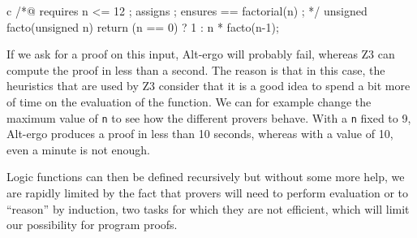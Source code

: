 \begin{CodeBlock}{c}
/*@ 
  requires n <= 12 ;
  assigns \nothing ;
  ensures \result == factorial(n) ; 
*/
unsigned facto(unsigned n){
  return (n == 0) ? 1 : n * facto(n-1);
}
\end{CodeBlock}



If we ask for a proof on this input, Alt-ergo will probably fail,
whereas Z3 can compute the proof in less than a second. The reason is
that in this case, the heuristics that are used by Z3 consider that it
is a good idea to spend a bit more of time on the evaluation of the
function. We can for example change the maximum value of \texttt{n} to
see how the different provers behave. With a \texttt{n} fixed to 9,
Alt-ergo produces a proof in less than 10 seconds, whereas with a value
of 10, even a minute is not enough.



Logic functions can then be defined recursively but without some more
help, we are rapidly limited by the fact that provers will need to
perform evaluation or to ``reason'' by induction, two tasks for which
they are not efficient, which will limit our possibility for program
proofs.
